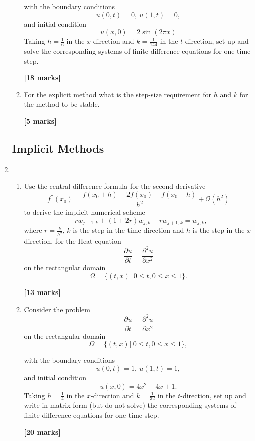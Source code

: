\begin{enumerate}
\begin{enumerate}
	with the boundary conditions
	\[ u(0,t)=0, \ u(1,t)=0,   \]
	and initial condition
	\[	u(x,0)=2\sin(2\pi x) \]
		Taking $h=\frac{1}{6}$ in the $x$-direction and $k=\frac{1}{144}$ in the $t$-direction, set up and solve the corresponding systems of finite difference equations for one time step.\\
\begin{flushright}
\textbf{[18 marks]}
\end{flushright}
	\item
	For the explicit method what is the step-size requirement for $h$ and $k$ for the method to be stable.
\begin{flushright}
\textbf{[5 marks]}
\end{flushright}
	
	
\end{enumerate}
\subsection{Implicit Methods}

	\item 
\begin{enumerate}
	
	\item 
	Use the central difference formula for the second derivative 
	\[ f^{''}(x_0)=\frac{f(x_0+h)-2f(x_0)+f(x_0-h)}{h^2}+\mathcal{O}(h^2)\]
	to derive the implicit numerical scheme
	\[-rw_{j-1,k}+(1+2r)w_{j,k}-rw_{j+1,k}=w_{j,k},\]
	where $r=\frac{k}{h^2}$, $k$ is the step in the time direction and $h$ is the step in the $x$ direction, 
	for the Heat equation 
	\[\frac{\partial u}{\partial t}=\frac{\partial^2 u}{\partial x^2} \]
	on the rectangular domain
		\[\Omega=\{(t,x)| \ 0\leq t, 0 \leq x \leq 1\}. \]

\begin{flushright}
\textbf{[13 marks]}
\end{flushright}
	
	\item Consider the problem
	\[\frac{\partial u}{\partial t}=\frac{\partial^2 u}{\partial x^2} \]
	on the rectangular domain
		\[\Omega=\{(t,x)| \ 0\leq t, 0 \leq x \leq 1\}, \]

	with the boundary conditions
	\[ u(0,t)=1, \ u(1,t)=1,   \]
	and initial condition
	\[	u(x,0)=4x^2-4x+1.\]
		Taking $h=\frac{1}{4}$ in the $x$-direction and $k=\frac{1}{32}$ in the $t$-direction, set up and write in matrix form (but do not solve) the corresponding systems of finite difference equations for one time step.\\
\begin{flushright}
\textbf{[20 marks]}
\end{flushright}
\end{enumerate}


\end{enumerate}
